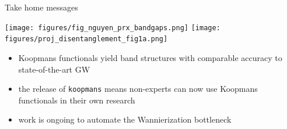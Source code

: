 \documentclass[xcolor=table,aspectratio=169]{beamer}
\newcommand\blfootcite[1]{%
  \begingroup
  \renewcommand\thefootnote{}\footnote{\hspace{-4ex}\cite{#1}}%
  \addtocounter{footnote}{-1}%
  \endgroup
}
\numberwithin{equation}{section}
\begin{document}
% 
% 
% 
% 
% 

\begin{frame}{Take home messages}

   \texttt{[image: figures/fig\_nguyen\_prx\_bandgaps.png]}
   \hfill
   \texttt{[image: figures/proj\_disentanglement\_fig1a.png]}
   \hfill

   \begin{itemize}
      \item Koopmans functionals yield band structures with comparable accuracy to state-of-the-art GW
      \item the release of \texttt{koopmans} means non-experts can now use Koopmans functionals in their own research
      \item work is ongoing to automate the Wannierization bottleneck
   \end{itemize}

\end{frame}
\end{document}
